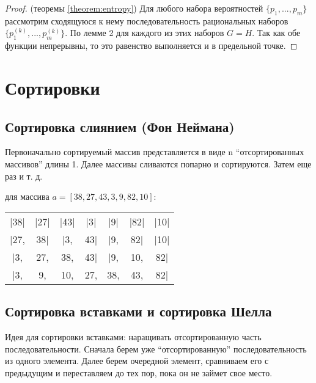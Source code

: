 \begin{proof}(теоремы \ref{theorem:entropy})
    Для любого набора вероятностей $\{p_1,...,p_m\}$ рассмотрим сходящуюся к нему 
    последовательность рациональных наборов $\{p_1^{(k)},...,p_m^{(k)}\}$. 
    По лемме 2 для каждого из этих наборов $G=H$. Так как обе функции непрерывны, то это равенство выполняется и в предельной точке.
\end{proof}

\chapter{Сортировки}

\section{Сортировка слиянием (Фон Неймана)}
Первоначально сортируемый массив представляется в виде n “отсортированных массивов” длины 1. Далее массивы сливаются попарно и сортируются. Затем еще раз и т. д.

\begin{eg}
    для массива $a = [38, 27, 43, 3, 9, 82, 10]$:

    \begin{tabular}{ccccccc}
        |38| & |27| & |43|& |3|& |9|& |82|& |10|\\
        |27,& 38| & |3, & 43| & |9, & 82| & |10| \\
        |3,& 27,& 38,& 43|& |9,& 10,& 82| \\
        |3,& 9,& 10,& 27,& 38,& 43,& 82| \\
    
    \end{tabular}       
\end{eg}

\section{Сортировка вставками и сортировка Шелла}

Идея для сортировки вставками: наращивать отсортированную часть последовательности. Сначала берем уже “отсортированную” последовательность из одного элемента. Далее берем очередной элемент, сравниваем его с предыдущим и переставляем до тех пор, пока он не займет свое место.

